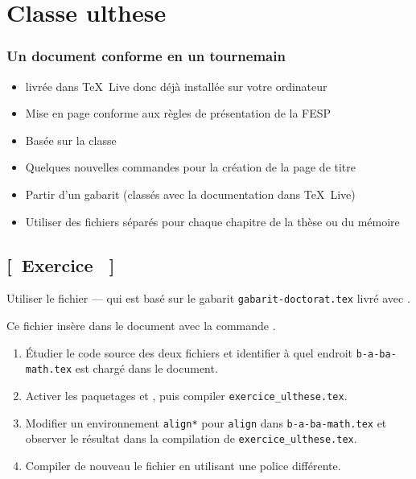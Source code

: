 \section{Classe ulthese}

\begin{frame}
  \frametitle{Un document conforme en un tournemain}
  \begin{itemize}
  \item {} livrée dans {\TeX}~Live donc déjà
    installée sur votre ordinateur
  \item Mise en page conforme aux règles de présentation de la FESP
  \item Basée sur la classe 
  \item Quelques nouvelles commandes pour la création de la page de
    titre
  \item Partir d'un gabarit (classés avec la documentation dans
    {\TeX}~Live)
  \item Utiliser des fichiers séparés pour chaque chapitre de la thèse
    ou du mémoire
  \end{itemize}
\end{frame}

\subsection{[~Exercice \theexerciceref~]}

\begin{frame}[plain,fragile=singleslide]
  \begin{exercice}
    Utiliser le fichier  --- qui est
    basé sur le gabarit \texttt{gabarit-doctorat.tex} livré avec
    .
    \medskip

    Ce fichier insère  dans le document
    avec la commande \verb==.
    \begin{enumerate}
    \item Étudier le code source des deux fichiers et identifier à
      quel endroit \texttt{b-a-ba-math.tex} est chargé dans le
      document.
    \item Activer les paquetages  et ,
      puis compiler \texttt{exercice\_ulthese.tex}.
    \item Modifier un environnement \texttt{align*} pour
      \texttt{align} dans \texttt{b-a-ba-math.tex} et observer le
      résultat dans la compilation de \texttt{exercice\_ulthese.tex}.
    \item Compiler de nouveau le fichier en utilisant une police
      différente.
    \end{enumerate}
  \end{exercice}
\end{frame}

